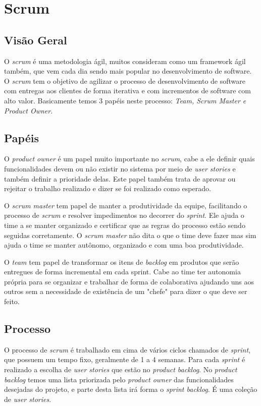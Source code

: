 \documentclass{abnt}
\begin{document}
	\section{Scrum}
	
		\subsection{Visão Geral}
		
			O \emph{scrum} é uma metodologia ágil, muitos consideram como um framework ágil também, que vem cada dia sendo mais popular
			no desenvolvimento de software. O \emph{scrum} tem o objetivo de agilizar o processo de desenvolvimento de software com entregas aos 
			clientes de forma iterativa e com incrementos de software com alto valor. Basicamente temos 3
			papéis neste processo: \emph{Team, Scrum Master e Product Owner}.
		
		\subsection{Papéis}
		
			O \emph{product owner} é um papel muito importante no \emph{scrum}, cabe a ele definir quais funcionalidades devem ou
			não existir no sistema por meio de \emph{user stories} e também definir a prioridade delas. Este papel também
			trata de aprovar ou rejeitar o trabalho realizado e dizer se foi realizado como esperado.
			
			O \emph{scrum master} tem papel de manter a produtividade da equipe, facilitando o processo de \emph{scrum} e resolver impedimentos
			no decorrer do \emph{sprint}. Ele ajuda o time a se manter organizado e certificar que as regras do processo estão sendo
			seguidas corretamente. O \emph{scrum master} não dita o que o time deve fazer mas sim ajuda o time se manter autônomo,
			organizado e com uma boa produtividade. 
			
			O \emph{team} tem papel de transformar os itens de \emph{backlog} em produtos que serão entregues de forma incremental em cada
			sprint. Cabe ao time ter autonomia própria para se organizar e trabalhar de forma de colaborativa ajudando uns aos
			outros sem a necessidade de existência de um "chefe" para dizer o que deve ser feito.
		
		\subsection{Processo}
		
			O processo de \emph{scrum} é trabalhado em cima de vários ciclos chamados de \emph{sprint}, que possuem um tempo fixo, geralmente de
			1 a 4 semanas. Para cada \emph{sprint} é realizado a escolha de \emph{user stories} que estão no \emph{product backlog}. No \emph{product backlog} temos uma lista priorizada 
			pelo \emph{product owner} das funcionalidades desejadas do projeto, e parte desta lista irá forma o \emph{sprint backlog}. É uma coleção de \emph{user stories}.
			
\end{document}
